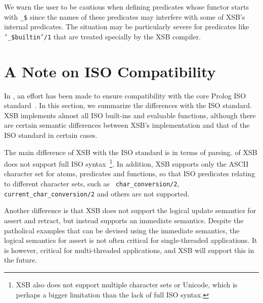 \begin{table}[htbp]
\caption{The Inline Predicates of XSB}\label{inlinepredicatetable}
\end{table}

We warn the user to be cautious when defining predicates whose functor
starts with {\tt \_\$} since the names of these predicates may
interfere with some of XSB's internal predicates.  The situation may
be particularly severe for predicates like {\tt '\_\$builtin'/1} that
are treated specially by the XSB compiler.

\section{A Note on ISO Compatibility} \label{sec:iso}

In \version, an effort has been made to ensure compatibility with the
core Prolog ISO standard~\cite{ISO-Prolog}.  In this section, we
summarize the differences with the ISO standard.  XSB implements
almost all ISO built-ins and evaluable functions, although there are
certain semantic differences between XSB's implementation and that of
the ISO standard in certain cases.

The main difference of XSB with the ISO standard is in terms of
parsing.  \version{} of XSB does not support full ISO
syntax~\footnote{XSB also does not support multiple character sets or
  Unicode, which is perhaps a bigger limitation than the lack of full
  ISO syntax.}.  In addition, XSB supports only the ASCII character
set for atoms, predicates and functions, so that ISO predicates
relating to different character sets, such as {\tt
  char\_conversion/2}, {\tt current\_char\_conversion/2} and others
are not supported.

Another difference is that XSB does not support the logical update
semantics for assert and retract, but instead supports an immediate
semantics.  Despite the patholical examples that can be devised using
the immediate semantics, the logical semantics for assert is not often
critical for single-threaded applications.  It is however, critical
for multi-threaded applications, and XSB will support this in the
future.

